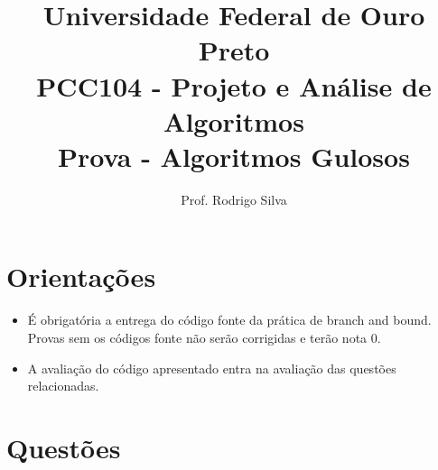 \documentclass{article}
\title{\vspace{-2 cm}Universidade Federal de Ouro Preto \\ PCC104 - Projeto e Análise de Algoritmos \\ Prova - Algoritmos Gulosos}
\author{Prof. Rodrigo Silva}
\begin{document}
\maketitle

\section*{Orientações}

\begin{itemize}
    \item É obrigatória a entrega do código fonte da prática de branch and bound. Provas sem os códigos fonte não serão corrigidas e terão nota 0.
    \item A avaliação do código apresentado entra na avaliação das questões relacionadas. 
\end{itemize}


\section*{Questões}
\end{document}
